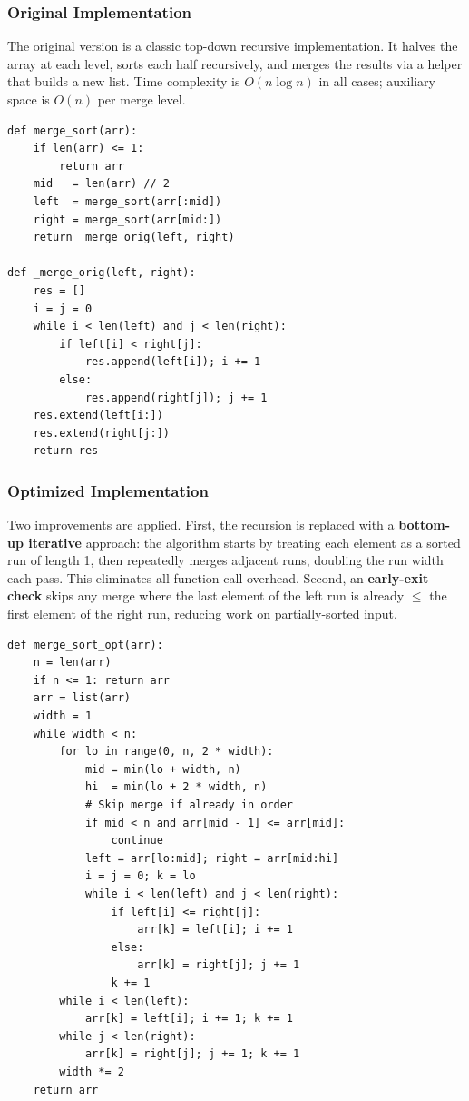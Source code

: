 \documentclass[12pt,a4paper]{article}
\begin{document}
	\subsubsection{Original Implementation}
	
	The original version is a classic top-down recursive implementation. It halves
	the array at each level, sorts each half recursively, and merges the results
	via a helper that builds a new list. Time complexity is $O(n\log n)$ in all
	cases; auxiliary space is $O(n)$ per merge level.
	
	\begin{lstlisting}[caption={MergeSort (original) -- top-down recursive.}]
def merge_sort(arr):
	if len(arr) <= 1:
		return arr
	mid   = len(arr) // 2
	left  = merge_sort(arr[:mid])
	right = merge_sort(arr[mid:])
	return _merge_orig(left, right)
		
def _merge_orig(left, right):
	res = []
	i = j = 0
	while i < len(left) and j < len(right):
		if left[i] < right[j]:
			res.append(left[i]); i += 1
		else:
			res.append(right[j]); j += 1
	res.extend(left[i:])
	res.extend(right[j:])
	return res
	\end{lstlisting}
	
	\subsubsection{Optimized Implementation}
	
	Two improvements are applied. First, the recursion is replaced with a
	\textbf{bottom-up iterative} approach: the algorithm starts by treating each
	element as a sorted run of length 1, then repeatedly merges adjacent runs,
	doubling the run width each pass. This eliminates all function call overhead.
	Second, an \textbf{early-exit check} skips any merge where the last element of
	the left run is already $\leq$ the first element of the right run, reducing
	work on partially-sorted input.
	
	\begin{lstlisting}[caption={MergeSort (optimized) -- bottom-up iterative with early-exit.}]
def merge_sort_opt(arr):
	n = len(arr)
	if n <= 1: return arr
	arr = list(arr)
	width = 1
	while width < n:
		for lo in range(0, n, 2 * width):
			mid = min(lo + width, n)
			hi  = min(lo + 2 * width, n)
			# Skip merge if already in order
			if mid < n and arr[mid - 1] <= arr[mid]:
				continue
			left = arr[lo:mid]; right = arr[mid:hi]
			i = j = 0; k = lo
			while i < len(left) and j < len(right):
				if left[i] <= right[j]:
					arr[k] = left[i]; i += 1
				else:
					arr[k] = right[j]; j += 1
				k += 1
		while i < len(left):
			arr[k] = left[i]; i += 1; k += 1
		while j < len(right):
			arr[k] = right[j]; j += 1; k += 1
		width *= 2
	return arr
	\end{lstlisting}
	
\end{document}
